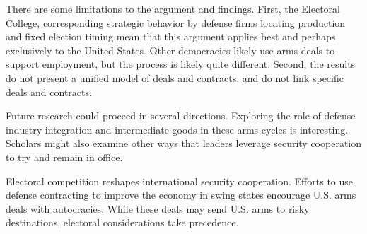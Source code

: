 \documentclass[12pt]{article}
\begin{document}
There are some limitations to the argument and findings.
First, the Electoral College, corresponding strategic behavior by defense firms locating production and fixed election timing mean that this argument applies best and perhaps exclusively to the United States.
Other democracies likely use arms deals to support employment, but the process is likely quite different. 
Second, the results do not present a unified model of deals and contracts, and do not link specific deals and contracts. 


Future research could proceed in several directions. 
Exploring the role of defense industry integration and intermediate goods in these arms cycles is interesting.
Scholars might also examine other ways that leaders leverage security cooperation to try and remain in office. 


Electoral competition reshapes international security cooperation.
Efforts to use defense contracting to improve the economy in swing states encourage U.S. arms deals with autocracies.
While these deals may send U.S. arms to risky destinations, electoral considerations take precedence. 


\newpage
\singlespace
 
 
\end{document}
